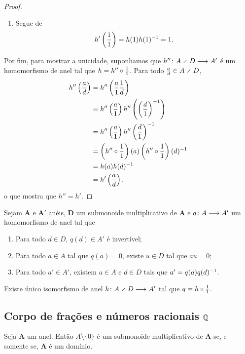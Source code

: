 \begin{proof}
\begin{enumerate}
\begin{enumerate}
		\item Segue de
			\begin{equation*}
			h' \left( \frac{1}{1} \right) = h(1)h(1)^{-1} = 1.
			\end{equation*}
		\end{enumerate}
	\end{enumerate}

Por fim, para mostrar a unicidade, suponhamos que $\fun{h''}{A \olddiv D}{A'}$ é um homomorfismo de anel tal que $h = h'' \circ \frac{\mathrm{I}}{1}$. Para todo $\frac{a}{d} \in A \olddiv D$,
	\begin{align*}
	h'' \left( \frac{a}{d} \right) &= h'' \left( \frac{a}{1}\frac{1}{d} \right) \\
		&= h'' \left( \frac{a}{1} \right) h'' \left( \left( \frac{d}{1} \right)^{-1} \right) \\
		&= h'' \left( \frac{a}{1} \right) h'' \left( \frac{d}{1} \right)^{-1} \\
		&= \left( h'' \circ \frac{\mathrm{I}}{1} \right) (a) \left( h'' \circ \frac{\mathrm{I}}{1} \right) (d)^{-1} \\
		&= h(a)h(d)^{-1} \\
		&= h' \left( \frac{a}{d} \right),
	\end{align*}
o que mostra que $h''=h'$.
\end{proof}

\begin{exercise}
Sejam $\bm A$ e $\bm A'$ anéis, $\bm D$ um submonoide multiplicativo de $\bm A$ e ${q}\colon {A} \longrightarrow {A'}$ um homomorfismo de anel tal que
	\begin{enumerate}
	\item Para todo $d \in D$, $q(d) \in A'$ é invertível;
	
	\item Para todo $a \in A$ tal que $q(a)=0$, existe $u \in D$ tal que $au=0$;
	
	\item Para todo $a' \in A'$, existem $a \in A$ e $d \in D$ tais que $a' = q(a)q(d)^{-1}$.
	\end{enumerate}
Existe único isomorfismo de anel $\fun{h}{A \olddiv D}{A'}$ tal que $q = h \circ \frac{\mathrm{I}}{1}$.
\end{exercise}

\subsection{Corpo de frações e números racionais \ensuremath{\Q}}

\begin{exercise}
Seja $\bm A$ um anel. Então $A \setminus \{0\}$ é um submonoide multiplicativo de $\bm A$ se, e somente se, $\bm A$ é um domínio.
\end{exercise}

